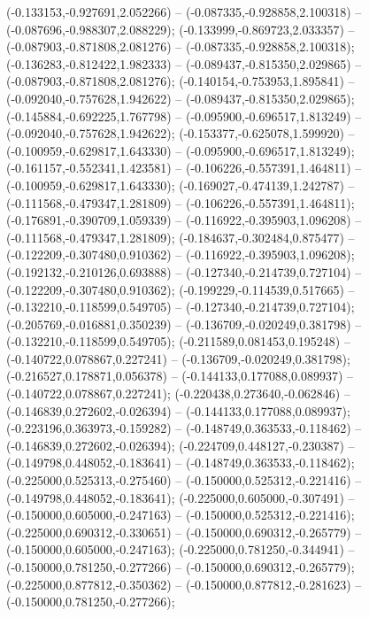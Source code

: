  (-0.133153,-0.927691,2.052266) -- (-0.087335,-0.928858,2.100318) -- (-0.087696,-0.988307,2.088229);
 (-0.133999,-0.869723,2.033357) -- (-0.087903,-0.871808,2.081276) -- (-0.087335,-0.928858,2.100318);
 (-0.136283,-0.812422,1.982333) -- (-0.089437,-0.815350,2.029865) -- (-0.087903,-0.871808,2.081276);
 (-0.140154,-0.753953,1.895841) -- (-0.092040,-0.757628,1.942622) -- (-0.089437,-0.815350,2.029865);
 (-0.145884,-0.692225,1.767798) -- (-0.095900,-0.696517,1.813249) -- (-0.092040,-0.757628,1.942622);
 (-0.153377,-0.625078,1.599920) -- (-0.100959,-0.629817,1.643330) -- (-0.095900,-0.696517,1.813249);
 (-0.161157,-0.552341,1.423581) -- (-0.106226,-0.557391,1.464811) -- (-0.100959,-0.629817,1.643330);
 (-0.169027,-0.474139,1.242787) -- (-0.111568,-0.479347,1.281809) -- (-0.106226,-0.557391,1.464811);
 (-0.176891,-0.390709,1.059339) -- (-0.116922,-0.395903,1.096208) -- (-0.111568,-0.479347,1.281809);
 (-0.184637,-0.302484,0.875477) -- (-0.122209,-0.307480,0.910362) -- (-0.116922,-0.395903,1.096208);
 (-0.192132,-0.210126,0.693888) -- (-0.127340,-0.214739,0.727104) -- (-0.122209,-0.307480,0.910362);
 (-0.199229,-0.114539,0.517665) -- (-0.132210,-0.118599,0.549705) -- (-0.127340,-0.214739,0.727104);
 (-0.205769,-0.016881,0.350239) -- (-0.136709,-0.020249,0.381798) -- (-0.132210,-0.118599,0.549705);
 (-0.211589,0.081453,0.195248) -- (-0.140722,0.078867,0.227241) -- (-0.136709,-0.020249,0.381798);
 (-0.216527,0.178871,0.056378) -- (-0.144133,0.177088,0.089937) -- (-0.140722,0.078867,0.227241);
 (-0.220438,0.273640,-0.062846) -- (-0.146839,0.272602,-0.026394) -- (-0.144133,0.177088,0.089937);
 (-0.223196,0.363973,-0.159282) -- (-0.148749,0.363533,-0.118462) -- (-0.146839,0.272602,-0.026394);
 (-0.224709,0.448127,-0.230387) -- (-0.149798,0.448052,-0.183641) -- (-0.148749,0.363533,-0.118462);
 (-0.225000,0.525313,-0.275460) -- (-0.150000,0.525312,-0.221416) -- (-0.149798,0.448052,-0.183641);
 (-0.225000,0.605000,-0.307491) -- (-0.150000,0.605000,-0.247163) -- (-0.150000,0.525312,-0.221416);
 (-0.225000,0.690312,-0.330651) -- (-0.150000,0.690312,-0.265779) -- (-0.150000,0.605000,-0.247163);
 (-0.225000,0.781250,-0.344941) -- (-0.150000,0.781250,-0.277266) -- (-0.150000,0.690312,-0.265779);
 (-0.225000,0.877812,-0.350362) -- (-0.150000,0.877812,-0.281623) -- (-0.150000,0.781250,-0.277266);
